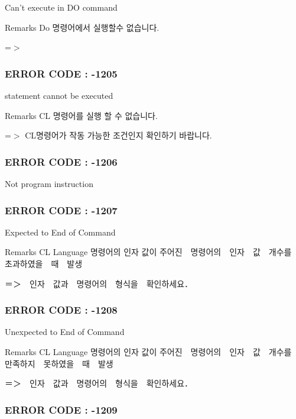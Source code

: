 Can't execute in D\-O command \begin{DoxyRemark}{Remarks}
Do 명령어에서 실행할수 없습니다.\par
 =$>$
\end{DoxyRemark}


 \subsubsection*{E\-R\-R\-O\-R C\-O\-D\-E \-: -\/1205 }

statement cannot be executed \begin{DoxyRemark}{Remarks}
C\-L 명령어를 실행 할 수 없습니다. \par
 =$>$ C\-L명령어가 작동 가능한 조건인지 확인하기 바랍니다.
\end{DoxyRemark}


 \subsubsection*{E\-R\-R\-O\-R C\-O\-D\-E \-: -\/1206 }

Not program instruction



 \subsubsection*{E\-R\-R\-O\-R C\-O\-D\-E \-: -\/1207 }

Expected to End of Command \begin{DoxyRemark}{Remarks}
C\-L Language 명령어의 인자 값이 주어진　명령어의　인자　값　개수를　초과하였을　때　발생 \par
 ＝＞　인자　값과　명령어의　형식을　확인하세요．
\end{DoxyRemark}


 \subsubsection*{E\-R\-R\-O\-R C\-O\-D\-E \-: -\/1208 }

Unexpected to End of Command \begin{DoxyRemark}{Remarks}
C\-L Language 명령어의 인자 값이 주어진　명령어의　인자　값　개수를　만족하지　못하였을　때　발생 \par
 ＝＞　인자　값과　명령어의　형식을　확인하세요．
\end{DoxyRemark}


 \subsubsection*{E\-R\-R\-O\-R C\-O\-D\-E \-: -\/1209 }

